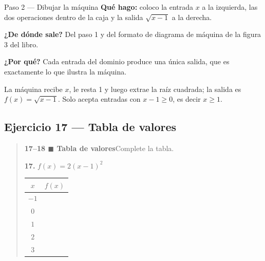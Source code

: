 \documentclass[11pt]{article}
\begin{document}
\begin{paso}{Paso 2 --- Dibujar la máquina}
\textbf{Qué hago:} coloco la entrada $x$ a la izquierda, las dos operaciones dentro de la caja y la salida $\sqrt{x-1}$ a la derecha.

\textbf{¿De dónde sale?} Del paso 1 y del formato de diagrama de máquina de la figura 3 del libro.

\textbf{¿Por qué?} Cada entrada del dominio produce una única salida, que es exactamente lo que ilustra la máquina.
\end{paso}

\begin{center}
\end{center}

\begin{resp}
La máquina recibe $x$, le resta 1 y luego extrae la raíz cuadrada; la salida es $f(x)=\sqrt{x-1}$. Solo acepta entradas con $x-1\ge0$, es decir $x\ge1$.
\end{resp}

\subsection*{Ejercicio 17 — Tabla de valores}

\begin{quote}
\textbf{17--18 $\blacksquare$ Tabla de valores}\quad Complete la tabla.

\textbf{17.} $f(x)=2(x-1)^2$

\begin{center}
\begin{tabular}{|c|c|}
\hline
$x$ & $f(x)$ \\ \hline
$-1$ & \\
$0$ & \\
$1$ & \\
$2$ & \\
$3$ & \\ \hline
\end{tabular}
\end{center}
\end{quote}
\end{document}
